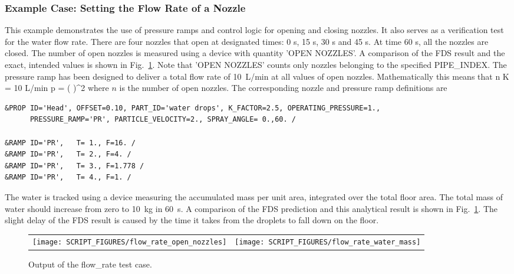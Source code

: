 \documentclass[11pt]{book}
\begin{document}
\subsubsection{Example Case: Setting the Flow Rate of a Nozzle}
\label{flow_rate}

This example demonstrates the use of pressure ramps and control logic for opening and closing nozzles. It also serves as a verification test for the water flow rate. There are four nozzles that open at designated times: 0 s, 15 s, 30 s and 45 s. At time 60 s, all the nozzles are closed. The number of open nozzles is measured using a device with quantity {\ct 'OPEN NOZZLES'}. A comparison of the FDS result and the exact, intended values is shown in Fig.~\ref{flow_rate_fig}.  Note that {\ct 'OPEN NOZZLES'} counts only nozzles belonging to the specified {\ct PIPE\_INDEX}. The pressure ramp has been designed to deliver a total flow rate of 10~L/min at all values of open nozzles. Mathematically this means that
\be
n K  = 10 \;\hbox{L/min} \quad \Rightarrow \quad
p = \left( \right)^2
\ee
where $n$ is the number of open nozzles. The corresponding nozzle and pressure ramp definitions are
\begin{lstlisting}
&PROP ID='Head', OFFSET=0.10, PART_ID='water drops', K_FACTOR=2.5, OPERATING_PRESSURE=1.,
      PRESSURE_RAMP='PR', PARTICLE_VELOCITY=2., SPRAY_ANGLE= 0.,60. /

&RAMP ID='PR',   T= 1., F=16. /
&RAMP ID='PR',   T= 2., F=4. /
&RAMP ID='PR',   T= 3., F=1.778 /
&RAMP ID='PR',   T= 4., F=1. /
\end{lstlisting}
The water is tracked using a device measuring the accumulated mass per unit area, integrated over the total floor area. The total mass of water should increase from zero to 10~kg in 60~s. A comparison of the FDS prediction and this analytical result is shown in Fig.~\ref{flow_rate_fig}. The slight delay of the FDS result is caused by the time it takes from the droplets to fall down on the floor.

\begin{figure}[ht]
\begin{tabular*}{\textwidth}{lr}
\texttt{[image: SCRIPT\_FIGURES/flow\_rate\_open\_nozzles]} &
\texttt{[image: SCRIPT\_FIGURES/flow\_rate\_water\_mass]}
\end{tabular*}
\caption[Results of the {\ct flow\_rate} test case]{Output of the {\ct flow\_rate} test case.}
\label{flow_rate_fig}
\end{figure}
\end{document}
